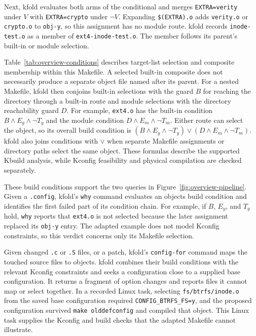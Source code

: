 \documentclass[acmsmall]{acmart}
\newcommand{\tool}{\textsf{kfold}\xspace}
\begin{document}
Next, \tool evaluates both arms of the conditional and merges \texttt{EXTRA=verity} under $V$ with \texttt{EXTRA=crypto} under $\neg V$.
Expanding \texttt{\$(EXTRA).o} adds \texttt{verity.o} or \texttt{crypto.o} to \texttt{obj-y}, so this assignment has no module route.
\tool records \texttt{inode-test.o} as a member of \texttt{ext4-inode-test.o}.
The member follows its parent's built-in or module selection.

Table~\ref{tab:overview-conditions} describes target-list selection and composite membership within this Makefile.
A selected built-in composite does not necessarily produce a separate object file named after its parent.
For a nested Makefile, \tool then conjoins built-in selections with the guard $B$ for reaching the directory through a built-in route and module selections with the directory reachability guard $D$.
For example, \texttt{ext4.o} has the built-in condition $B\land E_y\land\neg T_y$ and the module condition $D\land E_m\land\neg T_m$.
Either route can select the object, so its overall build condition is $(B\land E_y\land\neg T_y)\lor(D\land E_m\land\neg T_m)$.
\tool also joins conditions with $\lor$ when separate Makefile assignments or directory paths select the same object.
These formulas describe the supported Kbuild analysis, while Kconfig feasibility and physical compilation are checked separately.

These build conditions support the two queries in Figure~\ref{fig:overview-pipeline}.
Given a \texttt{.config}, \tool's \texttt{why} command evaluates an object\textquotesingle s build condition and identifies the first failed part of its condition chain.
For example, if $B$, $E_y$, and $T_y$ hold, \texttt{why} reports that \texttt{ext4.o} is not selected because the later assignment replaced its \texttt{obj-y} entry.
The adapted example does not model Kconfig constraints, so this verdict concerns only its Makefile selection.



Given changed \texttt{.c} or \texttt{.S} files, or a patch, \tool's \texttt{config-for} command maps the touched source files to objects.
\tool combines their build conditions with the relevant Kconfig constraints and seeks a configuration close to a supplied base configuration.
It returns a fragment of option changes and reports files it cannot map or select together.
In a recorded Linux task, selecting \texttt{fs/btrfs/inode.o} from the saved base configuration required \texttt{CONFIG\_BTRFS\_FS=y}, and the proposed configuration survived \texttt{make olddefconfig} and compiled that object.
This Linux task supplies the Kconfig and build checks that the adapted Makefile cannot illustrate.
\end{document}
